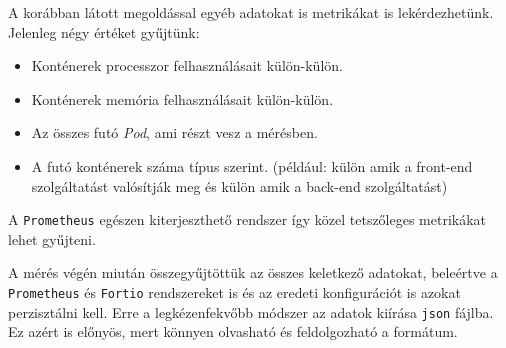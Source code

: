 

A korábban látott megoldással egyéb adatokat is metrikákat is lekérdezhetünk. Jelenleg négy értéket gyűjtünk:
\begin{itemize}
  \item Konténerek processzor felhasználásait külön-külön.
  \item Konténerek memória felhasználásait külön-külön.
  \item Az összes futó \textit{Pod}, ami részt vesz a mérésben.
  \item A futó konténerek száma típus szerint. (például: külön amik a front-end szolgáltatást valósítják meg és külön amik a back-end szolgáltatást)
\end{itemize}

A \verb+Prometheus+ egészen kiterjeszthető rendszer így közel tetszőleges metrikákat lehet gyűjteni. 


A mérés végén miután összegyűjtöttük az összes keletkező adatokat, beleértve a \verb+Prometheus+ és \verb+Fortio+ rendszereket is és az eredeti konfigurációt is azokat perzisztálni kell. Erre a legkézenfekvőbb módszer az adatok kiírása \verb+json+ fájlba. Ez azért is előnyös, mert könnyen olvasható és feldolgozható a formátum. 